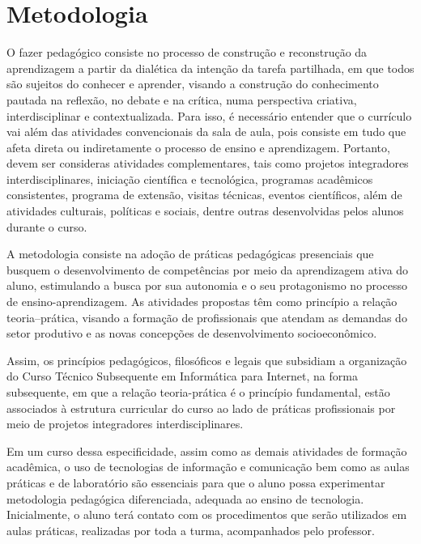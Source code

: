 \documentclass[
	12pt,				%
	openright,			%
	twoside,			%
	a4paper,			%
	chapter=TITLE,		%
	english,			%
	french,				%
	spanish,			%
	brazil,				%
	]{abntex2}
\begin{document}
\newpage
\section{Metodologia}


O fazer pedagógico consiste no processo de construção e reconstrução da aprendizagem a partir da dialética da intenção da tarefa partilhada, em que todos são sujeitos do conhecer e aprender, visando a construção do conhecimento pautada na reflexão, no debate e na crítica, numa perspectiva criativa, interdisciplinar e contextualizada.
%
Para isso, é necessário entender que o currículo vai além das atividades convencionais da sala de aula, pois consiste em tudo que afeta direta ou indiretamente o processo de ensino e aprendizagem. Portanto, devem ser consideras atividades complementares, tais como {projetos integradores} interdisciplinares, iniciação científica e tecnológica, programas acadêmicos consistentes, programa de extensão, visitas técnicas, eventos científicos, além de atividades culturais, políticas e sociais, dentre outras desenvolvidas pelos alunos durante o curso.

A metodologia consiste na adoção de práticas pedagógicas presenciais que busquem o desenvolvimento de competências por meio da aprendizagem ativa do aluno, estimulando a busca por sua autonomia e o seu protagonismo no processo de ensino-aprendizagem. As atividades propostas têm como princípio a relação teoria–prática, visando a formação de profissionais que atendam as demandas do setor produtivo e as novas concepções de desenvolvimento socioeconômico.

Assim, os princípios pedagógicos, filosóficos e legais que subsidiam a organização do Curso Técnico Subsequente em Informática para Internet, na forma subsequente, em que a relação teoria-prática é o princípio fundamental, estão associados à estrutura curricular do curso ao lado de práticas profissionais por meio de projetos integradores interdisciplinares.

Em um curso dessa especificidade, assim como as demais atividades de formação acadêmica, o uso de tecnologias de informação e comunicação bem como as aulas práticas e de laboratório são essenciais para que o aluno possa experimentar metodologia pedagógica diferenciada, adequada ao ensino de tecnologia. Inicialmente, o aluno terá contato com os procedimentos que serão utilizados em aulas práticas, realizadas por toda a turma, acompanhados pelo professor.%
\end{document}
